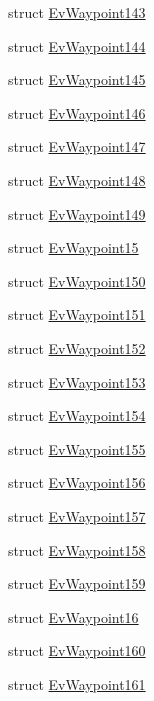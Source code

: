 \begin{DoxyCompactItemize}
struct \hyperlink{structmove__base__z__client_1_1EvWaypoint143}{Ev\+Waypoint143}
\item 
struct \hyperlink{structmove__base__z__client_1_1EvWaypoint144}{Ev\+Waypoint144}
\item 
struct \hyperlink{structmove__base__z__client_1_1EvWaypoint145}{Ev\+Waypoint145}
\item 
struct \hyperlink{structmove__base__z__client_1_1EvWaypoint146}{Ev\+Waypoint146}
\item 
struct \hyperlink{structmove__base__z__client_1_1EvWaypoint147}{Ev\+Waypoint147}
\item 
struct \hyperlink{structmove__base__z__client_1_1EvWaypoint148}{Ev\+Waypoint148}
\item 
struct \hyperlink{structmove__base__z__client_1_1EvWaypoint149}{Ev\+Waypoint149}
\item 
struct \hyperlink{structmove__base__z__client_1_1EvWaypoint15}{Ev\+Waypoint15}
\item 
struct \hyperlink{structmove__base__z__client_1_1EvWaypoint150}{Ev\+Waypoint150}
\item 
struct \hyperlink{structmove__base__z__client_1_1EvWaypoint151}{Ev\+Waypoint151}
\item 
struct \hyperlink{structmove__base__z__client_1_1EvWaypoint152}{Ev\+Waypoint152}
\item 
struct \hyperlink{structmove__base__z__client_1_1EvWaypoint153}{Ev\+Waypoint153}
\item 
struct \hyperlink{structmove__base__z__client_1_1EvWaypoint154}{Ev\+Waypoint154}
\item 
struct \hyperlink{structmove__base__z__client_1_1EvWaypoint155}{Ev\+Waypoint155}
\item 
struct \hyperlink{structmove__base__z__client_1_1EvWaypoint156}{Ev\+Waypoint156}
\item 
struct \hyperlink{structmove__base__z__client_1_1EvWaypoint157}{Ev\+Waypoint157}
\item 
struct \hyperlink{structmove__base__z__client_1_1EvWaypoint158}{Ev\+Waypoint158}
\item 
struct \hyperlink{structmove__base__z__client_1_1EvWaypoint159}{Ev\+Waypoint159}
\item 
struct \hyperlink{structmove__base__z__client_1_1EvWaypoint16}{Ev\+Waypoint16}
\item 
struct \hyperlink{structmove__base__z__client_1_1EvWaypoint160}{Ev\+Waypoint160}
\item 
struct \hyperlink{structmove__base__z__client_1_1EvWaypoint161}{Ev\+Waypoint161}

\end{DoxyCompactItemize}
